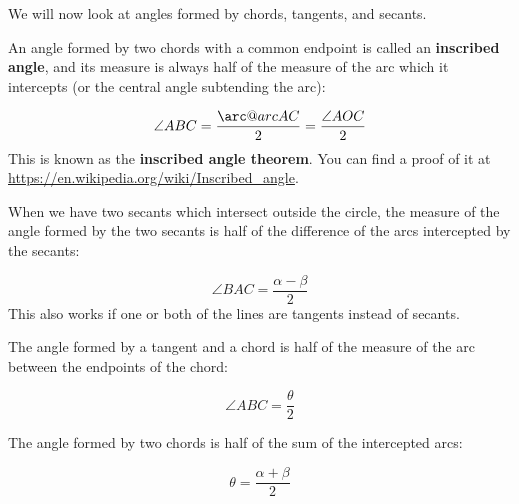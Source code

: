 \documentclass{article}
\makeatletter
\newcommand{\arc@char}{{\usefont{U}{tipa}{m}{n}\symbol{62}}}%
\newcommand{\arc}[1]{\mathpalette\arc@arc{#1}}
\newcommand{\arc@arc}[2]{%
	\sbox0{$\m@th#1#2$}%
	\vbox{
		\hbox{\resizebox{\wd0}{\height}{\arc@char}}
		\nointerlineskip
		\box0
	}%
}
\makeatother
\begin{document}
\begin{multicols}{2}
	We will now look at angles formed by chords, tangents, and secants.

	An angle formed by two chords with a common endpoint is called an \textbf{inscribed angle}, and its measure is always half of the measure of the arc which it intercepts (or the central angle subtending the arc):
	\begin{center}
	\end{center}
	\[
		\angle ABC = \frac{\arc{AC}}{2} = \frac{\angle AOC}{2}
	\]
	This is known as the \textbf{inscribed angle theorem}.
	You can find a proof of it at \url{https://en.wikipedia.org/wiki/Inscribed_angle}.

	When we have two secants which intersect outside the circle, the measure of the angle formed by the two secants is half of the difference of the arcs intercepted by the secants:
	\begin{center}
	\end{center}
	\[
		\angle BAC = \frac{\alpha - \beta}{2}
	\]
	This also works if one or both of the lines are tangents instead of secants.

	The angle formed by a tangent and a chord is half of the measure of the arc between the endpoints of the chord:
	\begin{center}
	\end{center}
	\[
		\angle ABC = \frac{\theta}{2}
	\]
	
	The angle formed by two chords is half of the sum of the intercepted arcs:
	\begin{center}
	\end{center}
	\[
		\theta = \frac{\alpha + \beta}{2}
	\]
\end{multicols}
\end{document}
